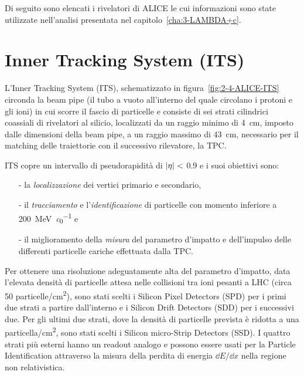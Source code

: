         Di seguito sono elencati i rivelatori di ALICE le cui informazioni sono state utilizzate nell’analisi presentata nel capitolo~\ref{cha:3-LAMBDA+c}.

\section{Inner Tracking System (ITS)}
    L’Inner Tracking System (ITS), schematizzato in figura~\ref{fig:2-4-ALICE-ITS} circonda la beam pipe (il tubo a vuoto all'interno del quale circolano i protoni e gli ioni) in cui scorre il fascio di particelle e consiste di sei strati cilindrici coassiali di rivelatori al silicio, localizzati da un raggio minimo di \qty{4}{\centi \meter}, imposto dalle dimensioni della beam pipe, a un raggio massimo di \qty{43}{\centi \meter}, necessario per il matching delle traiettorie con il successivo rilevatore, la TPC.
    
    ITS copre un intervallo di pseudorapidità di $\abs{\eta} <$ \num{0.9} e i suoi obiettivi sono:
    \begin{itemize}
        \item[-] la \textit{localizzazione} dei vertici primario e secondario,

        \item[-] il \textit{tracciamento} e l’\textit{identificazione} di particelle con momento inferiore a \qty[per-mode = symbol]{200}{\mega \eV \per \clight} e

        \item[-] il miglioramento della \textit{misura} del parametro d’impatto e dell’impulso delle differenti particelle cariche effettuata dalla TPC.
    \end{itemize}
    
    Per ottenere una risoluzione adeguatamente alta del parametro d’impatto, data l’elevata densità di particelle attesa nelle collisioni tra ioni pesanti a LHC (circa \num{50} particelle/\unit{\centi \meter^2}), sono stati scelti i Silicon Pixel Detectors (SPD) per i primi due strati a partire dall’interno e i Silicon Drift Detectors (SDD) per i successivi due. Per gli ultimi due strati, dove la densità di particelle prevista è ridotta a una particella/\unit{\centi \meter^2}, sono stati scelti i Silicon micro-Strip Detectors (SSD). I quattro strati più esterni hanno un readout analogo e possono essere usati per la Particle Identification attraverso la misura della perdita di energia $\dd{E}/\dd{x}$ nella regione non relativistica.

